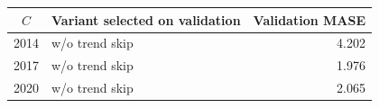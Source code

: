 \begin{tabular}{@{}clr@{}}
\toprule
$C$ & Variant selected on validation & Validation MASE \\
\midrule
2014 & w/o trend skip & 4.202 \\
2017 & w/o trend skip & 1.976 \\
2020 & w/o trend skip & 2.065 \\
\bottomrule
\end{tabular}

